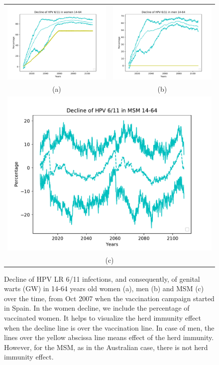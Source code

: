 \begin{figure}[!]
	\centering
	\begin{tabular}{cc}
		\includegraphics[width=0.5\linewidth]{IMGs/4.-Decline_verrugas/verr_muj.pdf}	& 
		\includegraphics[width=0.5\linewidth]{IMGs/4.-Decline_verrugas/verr_hom.pdf}  \\ 
		(a)	& (b) \\ 
		\multicolumn{2}{c}{ \includegraphics[width=0.5\linewidth]{IMGs/4.-Decline_verrugas/verr_MSM.pdf} } \\ 
		\multicolumn{2}{c}{(c)} \\ 
	\end{tabular} 
	\caption{Decline of HPV LR 6/11 infections, and consequently, of genital warts (GW) in 14-64 years old women (a), men (b) and MSM (c) over the time, from Oct 2007 when the vaccination campaign started in Spain. In the women decline, we include the percentage of vaccinated women. It helps to visualize the herd immunity effect when the decline line is over the vaccination line. In case of men, the lines over the yellow abscissa line means effect of the herd immunity. However, for the MSM, as in the Australian case, there is not herd immunity effect.}
	\label{fig:verrESP}
\end{figure}

